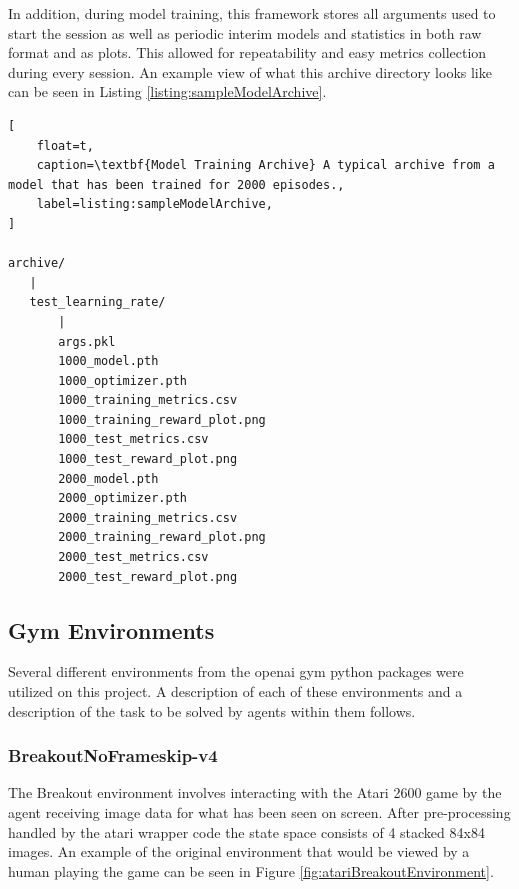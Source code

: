 \documentclass[conference]{IEEEtran}
\begin{document}
In addition, during model training, this framework stores all arguments used to start the session as well as periodic interim models and statistics in both raw format and as plots.
This allowed for repeatability and easy metrics collection during every session.
An example view of what this archive directory looks like can be seen in Listing \ref{listing:sampleModelArchive}.

\begin{lstlisting}[
    float=t,
    caption=\textbf{Model Training Archive} A typical archive from a model that has been trained for 2000 episodes.,
    label=listing:sampleModelArchive,
]

archive/
   |
   test_learning_rate/
       |
       args.pkl
       1000_model.pth
       1000_optimizer.pth
       1000_training_metrics.csv
       1000_training_reward_plot.png
       1000_test_metrics.csv
       1000_test_reward_plot.png
       2000_model.pth
       2000_optimizer.pth
       2000_training_metrics.csv
       2000_training_reward_plot.png
       2000_test_metrics.csv
       2000_test_reward_plot.png
\end{lstlisting}

\subsection{Gym Environments}
Several different environments from the openai gym python packages were utilized on this project.
A description of each of these environments and a description of the task to be solved by agents within them follows.

\subsubsection{BreakoutNoFrameskip-v4}
The Breakout environment involves interacting with the Atari 2600 game by the agent receiving image data for what has been seen on screen.
After pre-processing handled by the atari wrapper code the state space consists of 4 stacked 84x84 images.
An example of the original environment that would be viewed by a human playing the game can be seen in Figure \ref{fig:atariBreakoutEnvironment}.
\end{document}
